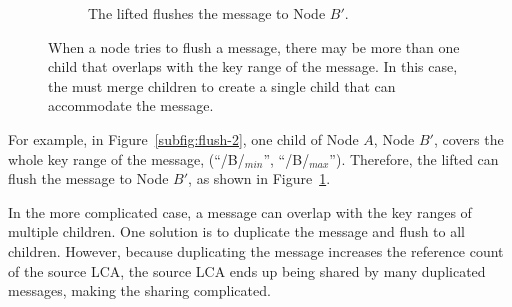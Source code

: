 \begin{figure}
\begin{subfigure}{\textwidth}
        \caption{\label{subfig:flush-3} The lifted \bedag flushes the \goto message
            to Node $B'$.}
    \end{subfigure}
    \caption[The \bedag merges children before flushing a \goto message]{\label{fig:flush}
        When a node tries to flush a \goto message, there may be more than
        one child that overlaps with the key range of the \goto message.
        In this case, the \bedag must merge children to create a single child
        that can accommodate the \goto message.}
\end{figure}

For example, in Figure~\ref{subfig:flush-2}, one child of Node $A$, Node $B'$,
covers the whole key range of the \goto message,
(``/B/$_{min}$'', ``/B/$_{max}$'').
Therefore, the lifted \bedag can flush the \goto message to Node $B'$,
as shown in Figure~\ref{subfig:flush-3}.

In the more complicated case, a \goto message can overlap with the key ranges
of multiple children.
One solution is to duplicate the \goto message and flush to all children.
However,
because duplicating the \goto message increases the reference count of the
source LCA,
the source LCA ends up being shared by many duplicated \goto messages,
making the sharing complicated.

